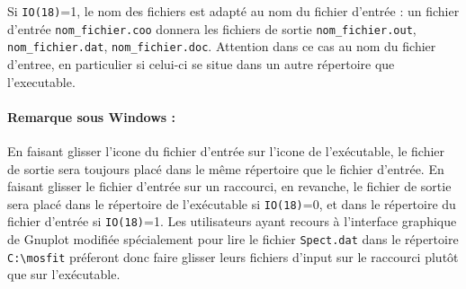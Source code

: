 Si \lstinline{IO(18)}=1, le nom des fichiers est adapté au nom du fichier d'entrée : un fichier d'entrée \lstinline{nom_fichier.coo} donnera les fichiers de sortie \lstinline{nom_fichier.out}, \lstinline{nom_fichier.dat}, \lstinline{nom_fichier.doc}.
Attention dans ce cas au nom du fichier d'entree, en particulier si celui-ci se situe dans un autre répertoire que l'executable. 

\paragraph{Remarque sous Windows :}
En faisant glisser l'icone du fichier d'entrée sur l'icone de l'exécutable, le fichier de sortie sera toujours placé dans le même répertoire que le fichier d'entrée. 
En faisant glisser le fichier d'entrée sur un raccourci, en revanche, le fichier de sortie sera placé dans le répertoire de l'exécutable si \lstinline{IO(18)}=0, et dans le répertoire du fichier d'entrée si \lstinline{IO(18)}=1.
Les utilisateurs ayant recours à l'interface graphique de Gnuplot modifiée spécialement pour lire le fichier \lstinline{Spect.dat} dans le répertoire \lstinline{C:\mosfit} préferont donc faire glisser leurs fichiers d'input sur le raccourci plutôt que sur l'exécutable. 
